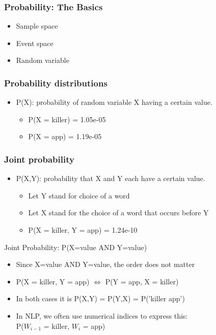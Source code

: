 \begin{frame}
\frametitle{Probability: The Basics}
\begin{itemize}[<+->]
\item Sample space
\item Event space
\item Random variable
\end{itemize}
\end{frame}

\begin{frame}
\frametitle{Probability distributions}
\begin{itemize}[<+->]
\item P(X): probability of random variable X having a certain value.
\begin{itemize}[<+->]
\item P(X = killer) = 1.05e-05 
\item P(X = app) = 1.19e-05
\end{itemize}
\end{itemize}
\end{frame}


\begin{frame}
\frametitle{Joint probability}
\begin{itemize}[<+->]
\item P(X,Y): probability that X and Y each have a certain value.
\begin{itemize}[<+->]
\item Let Y stand for choice of a word
\item Let X stand for the choice of a word that occurs before Y
\item P(X = killer, Y = app) = 1.24e-10
\end{itemize}
\end{itemize}
\pause
\begin{alertblock}{Joint Probability: P(X=value AND Y=value)}
\begin{itemize}
\item Since X=value AND Y=value, the order does not matter
\item {\color{blue} P(X = killer, Y = app)} $\Leftrightarrow$ {\color{red} P(Y = app, X = killer)}
\item In both cases it is P(X,Y) = P(Y,X) = P('killer app')
\item In NLP, we often use numerical indices to express this: \\
P($W_{i-1}$ = killer, $W_{i}$ = app)
\end{itemize}
\end{alertblock}
\end{frame}

